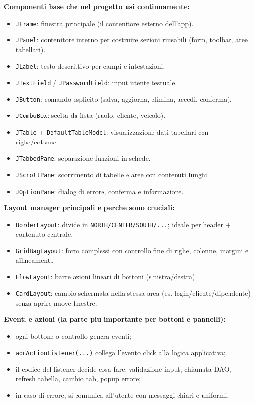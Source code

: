 \documentclass[12pt,a4paper]{article}
\begin{document}
\textbf{Componenti base che nel progetto usi continuamente:}
\begin{itemize}
  \item \texttt{JFrame}: finestra principale (il contenitore esterno dell'app).
  \item \texttt{JPanel}: contenitore interno per costruire sezioni riusabili (form, toolbar, aree tabellari).
  \item \texttt{JLabel}: testo descrittivo per campi e intestazioni.
  \item \texttt{JTextField} / \texttt{JPasswordField}: input utente testuale.
  \item \texttt{JButton}: comando esplicito (salva, aggiorna, elimina, accedi, conferma).
  \item \texttt{JComboBox}: scelta da lista (ruolo, cliente, veicolo).
  \item \texttt{JTable} + \texttt{DefaultTableModel}: visualizzazione dati tabellari con righe/colonne.
  \item \texttt{JTabbedPane}: separazione funzioni in schede.
  \item \texttt{JScrollPane}: scorrimento di tabelle e aree con contenuti lunghi.
  \item \texttt{JOptionPane}: dialog di errore, conferma e informazione.
\end{itemize}

\textbf{Layout manager principali e perche sono cruciali:}
\begin{itemize}
  \item \texttt{BorderLayout}: divide in \texttt{NORTH/CENTER/SOUTH/...}; ideale per header + contenuto centrale.
  \item \texttt{GridBagLayout}: form complessi con controllo fine di righe, colonne, margini e allineamenti.
  \item \texttt{FlowLayout}: barre azioni lineari di bottoni (sinistra/destra).
  \item \texttt{CardLayout}: cambio schermata nella stessa area (es. login/cliente/dipendente) senza aprire nuove finestre.
\end{itemize}

\textbf{Eventi e azioni (la parte piu importante per bottoni e pannelli):}
\begin{itemize}
  \item ogni bottone o controllo genera eventi;
  \item \texttt{addActionListener(...)} collega l'evento click alla logica applicativa;
  \item il codice del listener decide cosa fare: validazione input, chiamata DAO, refresh tabella, cambio tab, popup errore;
  \item in caso di errore, si comunica all'utente con messaggi chiari e uniformi.
\end{itemize}
\end{document}
